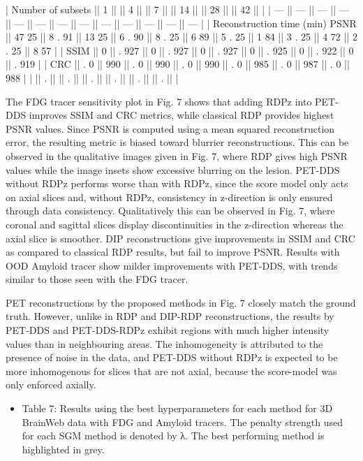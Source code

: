\documentclass{article}
\begin{document}
| Number of subsets              || 1     ||        || 4     ||        || 7      ||       || 14     ||       || 28     ||       || 42     ||       |
| ---                            || ---   || ---    || ---   || ---    || ---    || ---   || ---    || ---   || ---    || ---   || ---    || ---   |
| Reconstruction time (min) PSNR || 47 25 || 8 . 91 || 13 25 || 6 . 90 || 8 . 25 || 6 89  || 5 . 25 || 1 84  || 3 . 25 || 4 72  || 2 . 25 || 8 57  |
| SSIM                           || 0     || . 927  || 0     || . 927  || 0      || . 927 || 0      || . 925 || 0      || . 922 || 0      || . 919 |
| CRC                            || . 0   || 990    || . 0   || 990    || . 0    || 990   || . 0    || 985   || . 0    || 987   || . 0    || 988   |
|                                || .     ||        || .     ||        || .      ||       || .      ||       || .      ||       || .      ||       |

The FDG tracer sensitivity plot in Fig. 7 shows that adding RDPz into PET-DDS improves SSIM and CRC metrics, while classical RDP provides highest PSNR values. Since PSNR is computed using a mean squared reconstruction error, the resulting metric is biased toward blurrier reconstructions. This can be observed in the qualitative images given in Fig. 7, where RDP gives high PSNR values while the image insets show excessive blurring on the lesion. PET-DDS without RDPz performs worse than with RDPz, since the score model only acts on axial slices and, without RDPz, consistency in z-direction is only ensured through data consistency. Qualitatively this can be observed in Fig. 7, where coronal and sagittal slices display discontinuities in the z-direction whereas the axial slice is smoother. DIP reconstructions give improvements in SSIM and CRC as compared to classical RDP results, but fail to improve PSNR. Results with OOD Amyloid tracer show milder improvements with PET-DDS, with trends similar to those seen with the FDG tracer.

PET reconstructions by the proposed methods in Fig. 7 closely match the ground truth. However, unlike in RDP and DIP-RDP reconstructions, the results by PET-DDS and PET-DDS-RDPz exhibit regions with much higher intensity values than in neighbouring areas. The inhomogeneity is attributed to the presence of noise in the data, and PET-DDS without RDPz is expected to be more inhomogenous for slices that are not axial, because the score-model was only enforced axially.
\begin{itemize}
\item 
Table 7: Results using the best hyperparameters for each method for 3D BrainWeb data with FDG and Amyloid tracers. The penalty strength used for each SGM method is denoted by λ. The best performing method is highlighted in grey.

\end{itemize}
\end{document}
